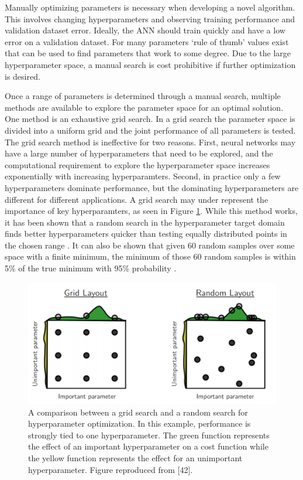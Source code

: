 Manually optimizing parameters is necessary when developing a novel algorithm. This involves changing hyperparameters and observing training performance and validation dataset error. Ideally, the ANN should train quickly and have a low error on a validation dataset. For many parameters `rule of thumb' values exist that can be used to find parameters that work to some degree. Due to the large hyperparameter space, a manual search is cost prohibitive if further optimization is desired.

Once a range of parameters is determined through a manual search, multiple methods are available to explore the parameter space for an optimal solution. One method is an exhaustive grid search. In a grid search the parameter space is divided into a uniform grid and the joint performance of all parameters is tested. The grid search method is ineffective for two reasons. First, neural networks may have a large number of hyperparameters that need to be explored, and the computational requirement to explore the hyperparameter space increases exponentially with increasing hyperparamters. Second, in practice only a few hyperparameters dominate performance, but the dominating hyperparameters are different for different applications. A grid search may under represent the importance of key hyperparamters, as seen in Figure \ref{fig:Bergstra12a_hyperparameter_grid_vs_random}.  While this method works, it has been shown that a random search in the hyperparameter target domain finds better hyperparameters quicker than testing equally distributed points in the chosen range \cite{Bergstra2012}. It can also be shown that given 60 random samples over some space with a finite minimum, the minimum of those 60 random samples is within 5\% of the true minimum with 95\% probability \cite{Zheng2015}.%

\begin{figure}[H]
	\centering
	\includegraphics[width=0.99\linewidth]{images/Bergstra12a_hyperparameter_grid_vs_random}
	\caption{A comparison between a grid search and a random search for hyperparameter optimization. In this example, performance is strongly tied to one hyperparameter. The green function represents the effect of an important hyperparameter on a cost function while the yellow function represents the effect for an unimportant hyperparameter. Figure reproduced from [42].}
	\label{fig:Bergstra12a_hyperparameter_grid_vs_random}
\end{figure}


